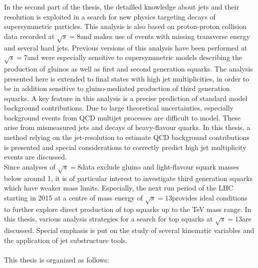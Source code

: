 In the second part of the thesis, the detailled knowledge about jets and their resolution is exploited in a search for new physics targeting decays of supersymmetric particles. This analysis is also based on proton-proton collision data recorded at $\sqrt{s} = 8$\tev and makes use of events with missing transverse energy and several hard jets. Previous versions of this analysis have been performed at $\sqrt{s} = 7$\tev and were especially sensitive to supersymmetric models describing the production of gluinos as well as first and second generation squarks. The analysis presented here is extended to final states with high jet multiplicities, in order to be in addition sensitive to gluino-mediated production of third generation squarks. A key feature in this analysis is a precise prediction of standard model background contributions. Due to large theoretical uncertainties, especially background events from QCD multijet processes are difficult to model. These arise from mismeasured jets and decays of heavy-flavour quarks. In this thesis, a method relying on the jet-\pt resolution to estimate QCD background contributions is presented and special considerations to correctly predict high jet multiplicity events are discussed.  \\
Since analyses of $\sqrt{s} = 8$\tev data exclude gluino and light-flavour squark masses below around 1\tev, it is of particular interest to investigate third generation squarks which have weaker mass limits. Especially, the next run period of the LHC starting in 2015 at a centre of mass energy of $\sqrt{s} = 13$\tev provides ideal conditions to further explore direct production of top squarks up to the TeV mass range. In this thesis, various analysis strategies for a search for top squarks at $\sqrt{s} = 13$\tev are discussed. Special emphasis is put on the study of several kinematic variables and the application of jet substructure tools. \\ 
\\
This thesis is organized as follows:
